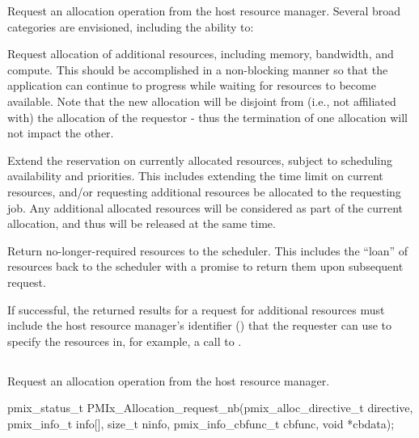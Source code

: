 \optattrend

\descr

Request an allocation operation from the host resource manager.
Several broad categories are envisioned, including the ability to:

\begin{compactitem}
%
\item Request allocation of additional resources, including memory, bandwidth, and compute.
This should be accomplished in a non-blocking manner so that the application can continue to progress while waiting for resources to become available.
Note that the new allocation will be disjoint from (i.e., not affiliated with) the allocation of the requestor - thus the termination of one allocation will not impact the other.
%
\item Extend the reservation on currently allocated resources, subject to scheduling availability and priorities.
This includes extending the time limit on current resources, and/or requesting additional resources be allocated to the requesting job.
Any additional allocated resources will be considered as part of the current allocation, and thus will be released at the same time.
%
\item Return no-longer-required resources to the scheduler.
This includes the ``loan'' of resources back to the scheduler with a promise to return them upon subsequent request.
\end{compactitem}

If successful, the returned results for a request for additional resources must include the host resource manager's identifier () that the requester can use to specify the resources in, for example, a call to .

\subsection{}

\summary

Request an allocation operation from the host resource manager.

\format

\cspecificstart
\begin{codepar}
pmix_status_t
PMIx_Allocation_request_nb(pmix_alloc_directive_t directive,
                           pmix_info_t info[], size_t ninfo,
                           pmix_info_cbfunc_t cbfunc, void *cbdata);
\end{codepar}
\cspecificend

